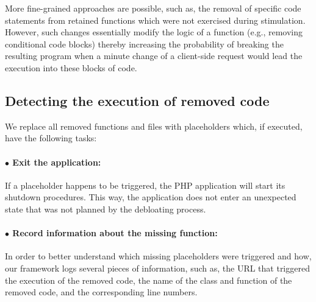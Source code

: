 More fine-grained approaches are possible, such as, the removal of specific code statements from retained functions which were not exercised during stimulation.
However, such changes essentially modify the logic of a function (e.g., removing
conditional code blocks) thereby increasing the probability of breaking the
resulting program when a minute change of a client-side request would lead the
execution into these blocks of code.


\subsection{Detecting the execution of removed code}


We replace all removed functions and files with placeholders which, if executed,
have the following tasks:
\vspace{-2ex}
\paragraph{$\bullet$ Exit the application:} If a placeholder happens to be triggered,
the PHP application will start its shutdown procedures. This way, the
application does not enter an unexpected state that was not planned by the
debloating process.
\vspace{-2ex}
\paragraph{$\bullet$ Record information about the missing function:} In order
to better understand which missing placeholders were triggered and how,
our framework logs several pieces of information, such as, the URL that
triggered the execution of the removed code, the name of the class and
function of the removed code, and the
corresponding line numbers.

